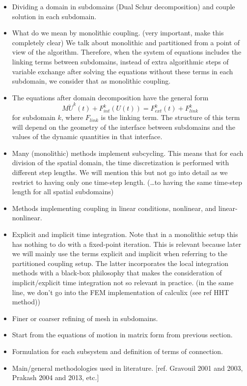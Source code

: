 \documentclass[a4paper, 11pt, oneside]{Thesis}  %
\begin{document}
        \begin{itemize}
            \item Dividing a domain in subdomains (Dual Schur decomposition) and couple solution in each subdomain. 
            \item What do we mean by monolithic coupling. (very important, make this completely clear) We talk about monolithic and partitioned from a point of view of the algorithm. Therefore, when the system of equations includes the linking terms between subdomains, instead of extra algorithmic steps of variable exchange after solving the equations without these terms in each subdomain, we consider that as monolithic coupling.
            \item The equations after domain decomposition have the general form
                \begin{equation}
                    M\ddot{U}^{k}(t) + F_{int}^{k}(U(t)) = F_{ext}^{k}(t) + F_{link}^{k}
                    \label{eq:3}
                \end{equation}
            for subdomain $k$, where $F_{link}$ is the linking term. The structure of this term will depend on the geometry of the interface between subdomains and the values of the dynamic quantities in that interface.
            \item Many (monolithic) methods implement subcycling. This means that for each division of the spatial domain, the time discretization is performed with different step lengths. We will mention this but not go into detail as we restrict to having only one time-step length. (\ldots to having the same time-step length for all spatial subdomains)
            \item Methods implementing coupling in linear conditions, nonlinear, and linear-nonlinear. 
            \item Explicit and implicit time integration. Note that in a monolithic setup this has nothing to do with a fixed-point iteration. This is relevant because later we will mainly use the terms explicit and implicit when referring to the partitioned coupling setup. The latter incorporates the local integration methods with a black-box philosophy that makes the consideration of implicit/explicit time integration not so relevant in practice. (in the same line, we don't go into the FEM implementation of calculix (see ref HHT method))
            \item Finer or coarser refining of mesh in subdomains.
            \item Start from the equations of motion in matrix form from previous section.
            \item Formulation for each subsystem and definition of terms of connection.
            \item Main/general methodologies used in literature. [ref. Gravouil 2001 and 2003, Prakash 2004 and 2013, etc.]
        \end{itemize}    
    
\end{document}
